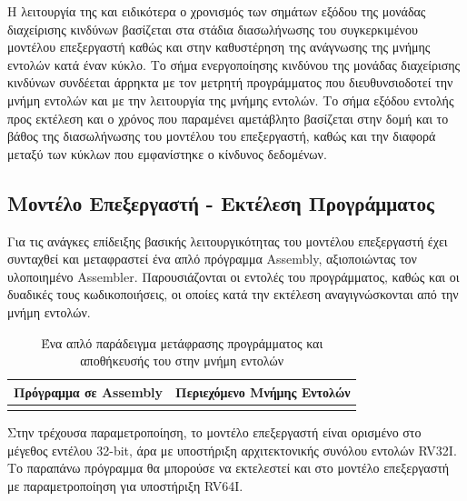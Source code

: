 \documentclass[11pt]{extarticle}
\begin{document}
Η λειτουργία της και ειδικότερα ο χρονισμός των σημάτων εξόδου της μονάδας διαχείρισης κινδύνων βασίζεται στα στάδια διασωλήνωσης του συγκερκιμένου μοντέλου επεξεργαστή καθώς και στην καθυστέρηση της ανάγνωσης της μνήμης εντολών κατά έναν κύκλο.
Το σήμα ενεργοποίησης κινδύνου της μονάδας διαχείρισης κινδύνων συνδέεται άρρηκτα με τον μετρητή προγράμματος που διευθυνσιοδοτεί την μνήμη εντολών και με την λειτουργία της μνήμης εντολών.
Το σήμα εξόδου εντολής προς εκτέλεση και ο χρόνος που παραμένει αμετάβλητο βασίζεται στην δομή και το βάθος της διασωλήνωσης του μοντέλου του επεξεργαστή, καθώς και την διαφορά μεταξύ των κύκλων που εμφανίστηκε ο κίνδυνος δεδομένων.

\subsection{Μοντέλο Επεξεργαστή - Εκτέλεση Προγράμματος}
Για τις ανάγκες επίδειξης βασικής λειτουργικότητας του μοντέλου επεξεργαστή έχει συνταχθεί και μεταφραστεί ένα απλό πρόγραμμα Assembly, αξιοποιώντας τον υλοποιημένο Assembler.
Παρουσιάζονται οι εντολές του προγράμματος, καθώς και οι δυαδικές τους κωδικοποιήσεις, οι οποίες κατά την εκτέλεση αναγιγνώσκονται από την μνήμη εντολών.

\begin{table}[H]
    \centering
    \begin{tabular}{|c|c|}
    \hline
    \cellcolor{lgray} \textbf{Πρόγραμμα σε Assembly} & \cellcolor{lgray} \textbf{Περιεχόμενο Μνήμης Εντολών\footnotemark} \\\hline
     &  \\\hline
    \end{tabular}
    \caption[Απλή Μετάφραση Προγράμματος]{\label{tab:widgets}Ένα απλό παράδειγμα μετάφρασης προγράμματος και αποθήκευσής του στην μνήμη εντολών}
\end{table}

Στην τρέχουσα παραμετροποίηση, το μοντέλο επεξεργαστή είναι ορισμένο στο μέγεθος εντέλου 32-bit, άρα με υποστήριξη αρχιτεκτονικής συνόλου εντολών RV32I.
Το παραπάνω πρόγραμμα θα μπορούσε να εκτελεστεί και στο μοντέλο επεξεργαστή με παραμετροποίηση για υποστήριξη RV64I.
\end{document}
